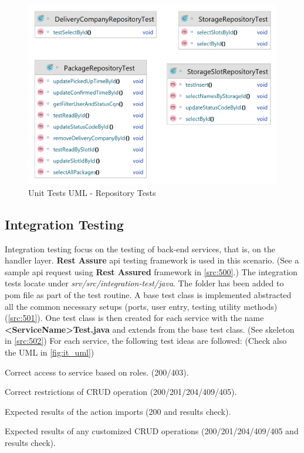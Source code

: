\begin{figure}[H]
    \centering
    \includegraphics[width=1\linewidth]{images/test/repository_tests_white.png}
    \caption{Unit Tests UML - Repository Tests}
    \label{fig:ut_uml_repo}
\end{figure}


\subsection{Integration Testing}
\label{subsec:test-api}

Integration testing focus on the testing of back-end services, that is, on the handler layer. \textbf{Rest Assure} \cite{test-rest-asstured} api testing framework is used in this scenario. (See a sample api request using \textbf{Rest Assured} framework in \autoref{src:500}.)
The integration tests locate under \textit{srv/src/integration-test/java}. The folder has been added to pom file as part of the test routine. A base test class is implemented abstracted all the common necessary setups (ports, user entry, testing utility methods) (\autoref{src:501}). One test class is then created for each service with the name \textbf{<ServiceName>Test.java} and extends from the base test class. (See skeleton in \autoref{src:502}) For each service, the following test ideas are followed: (Check also the UML in \autoref{fig:it_uml})
\begin{compactenum}
	\item Correct access to service based on roles. (200/403).
    \item Correct restrictions of CRUD operation (200/201/204/409/405).
    \item Expected results of the action imports (200 and results check).
    \item Expected results of any customized CRUD operations (200/201/204/409/405 and results check).
\end{compactenum}

